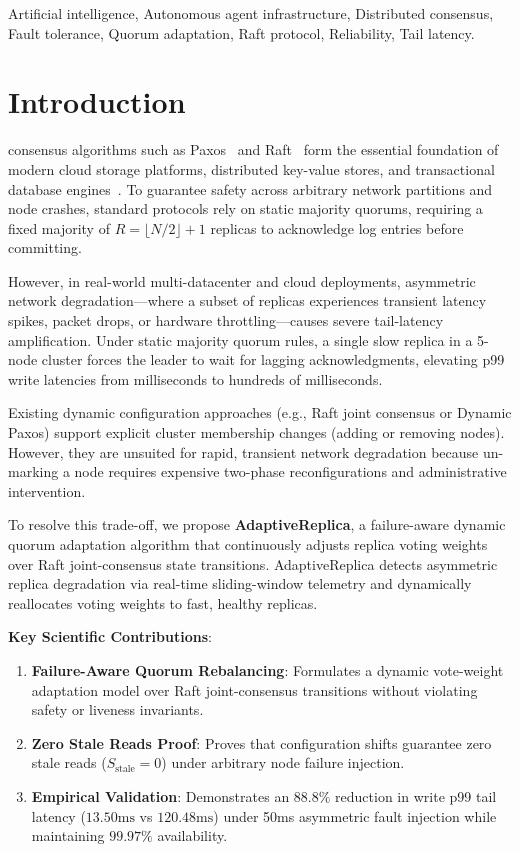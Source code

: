 \documentclass[journal]{IEEEtai}
\begin{document}
\begin{IEEEkeywords}
Artificial intelligence, Autonomous agent infrastructure, Distributed consensus, Fault tolerance, Quorum adaptation, Raft protocol, Reliability, Tail latency.
\end{IEEEkeywords}

\section{Introduction}

 consensus algorithms such as Paxos~\cite{lamport1998part, lamport2001paxos} and Raft~\cite{ongaro2014search} form the essential foundation of modern cloud storage platforms, distributed key-value stores, and transactional database engines~\cite{corbett2013spanner, burrows2006chubby, hunt2010zookeeper}. To guarantee safety across arbitrary network partitions and node crashes, standard protocols rely on static majority quorums, requiring a fixed majority of $R = \lfloor N/2 \rfloor + 1$ replicas to acknowledge log entries before committing.

However, in real-world multi-datacenter and cloud deployments, asymmetric network degradation---where a subset of replicas experiences transient latency spikes, packet drops, or hardware throttling---causes severe tail-latency amplification. Under static majority quorum rules, a single slow replica in a 5-node cluster forces the leader to wait for lagging acknowledgments, elevating p99 write latencies from milliseconds to hundreds of milliseconds.

Existing dynamic configuration approaches (e.g., Raft joint consensus or Dynamic Paxos) support explicit cluster membership changes (adding or removing nodes). However, they are unsuited for rapid, transient network degradation because un-marking a node requires expensive two-phase reconfigurations and administrative intervention.

To resolve this trade-off, we propose \textbf{AdaptiveReplica}, a failure-aware dynamic quorum adaptation algorithm that continuously adjusts replica voting weights over Raft joint-consensus state transitions. AdaptiveReplica detects asymmetric replica degradation via real-time sliding-window telemetry and dynamically reallocates voting weights to fast, healthy replicas.

\textbf{Key Scientific Contributions}:
\begin{enumerate}
    \item \textbf{Failure-Aware Quorum Rebalancing}: Formulates a dynamic vote-weight adaptation model over Raft joint-consensus transitions without violating safety or liveness invariants.
    \item \textbf{Zero Stale Reads Proof}: Proves that configuration shifts guarantee zero stale reads ($S_{\text{stale}} = 0$) under arbitrary node failure injection.
    \item \textbf{Empirical Validation}: Demonstrates an $88.8\%$ reduction in write p99 tail latency ($13.50\text{ms}$ vs $120.48\text{ms}$) under 50ms asymmetric fault injection while maintaining $99.97\%$ availability.
\end{enumerate}
\end{document}
